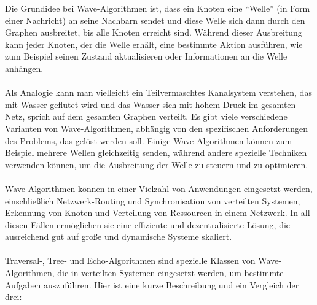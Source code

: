 Die Grundidee bei Wave-Algorithmen ist, dass ein Knoten eine \enquote{Welle} (in Form einer Nachricht) an seine Nachbarn sendet und diese Welle sich dann durch den Graphen ausbreitet, bis alle Knoten erreicht sind. Während dieser Ausbreitung kann jeder Knoten, der die Welle erhält, eine bestimmte Aktion ausführen, wie zum Beispiel seinen Zustand aktualisieren oder Informationen an die Welle anhängen.
\\\\
Als Analogie kann man vielleicht ein Teilvermaschtes Kanalsystem verstehen, das mit Wasser geflutet wird und das Wasser sich mit hohem Druck im gesamten Netz, sprich auf dem gesamten Graphen verteilt. 
Es gibt viele verschiedene Varianten von Wave-Algorithmen, abhängig von den spezifischen Anforderungen des Problems, das gelöst werden soll. Einige Wave-Algorithmen können zum Beispiel mehrere Wellen gleichzeitig senden, während andere spezielle Techniken verwenden können, um die Ausbreitung der Welle zu steuern und zu optimieren.
\\\\
Wave-Algorithmen können in einer Vielzahl von Anwendungen eingesetzt werden, einschließlich Netzwerk-Routing und Synchronisation von verteilten Systemen, Erkennung von Knoten und Verteilung von Ressourcen in einem Netzwerk. In all diesen Fällen ermöglichen sie eine effiziente und dezentralisierte Lösung, die ausreichend gut auf große und dynamische Systeme skaliert.
\\\\
Traversal-, Tree- und Echo-Algorithmen sind spezielle Klassen von Wave-Algorithmen, die in verteilten Systemen eingesetzt werden, um bestimmte Aufgaben auszuführen. Hier ist eine kurze Beschreibung und ein Vergleich der drei:

